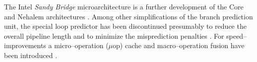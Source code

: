 
The Intel\TReg{} \emph{San\-dy Bridge} microarchitecture is a further
development of the Core and Nehalem architectures \cite{fog11}. Among other
simplifications of the branch prediction unit, the special loop predictor has
been discontinued presumably to reduce the overall pipeline length and to
minimize the misprediction penalties \cite{fog11}. For speed--improvements a
micro--operation ($\mu$op) cache and macro--operation fusion have been
introduced \cite{fog11}.

